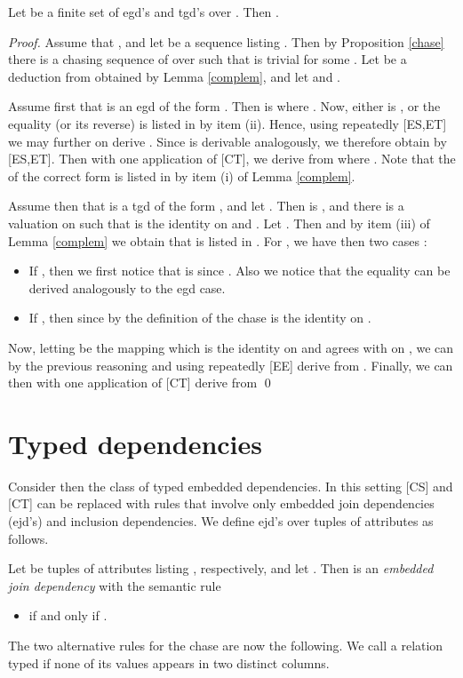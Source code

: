 \documentclass[envcountset]{llncs}
\begin{document}
\begin{theorem}
Let  be a finite set of egd's and tgd's over . Then  .
\end{theorem}
\begin{proof}
Assume that , and let  be a sequence listing . Then by Proposition \ref{chase} there is a chasing sequence  of  over  such that  is trivial for some . Let  be a deduction from  obtained by Lemma \ref{complem}, and let  and .

Assume first that  is an egd of the form . Then  is  where . Now, either  is , or the equality  (or its reverse) is listed in  by item (ii). Hence, using repeatedly [ES,ET] we may further on derive . Since  is derivable analogously, we therefore obtain  by [ES,ET]. Then with one application of [CT], we  derive  from  where . Note that the  of the correct form is listed in  by item (i) of Lemma \ref{complem}.


Assume then that  is a tgd of the form , and let . Then  is , and there is a valuation  on  such that  is the identity on  and .  Let  . Then  and by item (iii) of Lemma \ref{complem} we obtain that  is listed in .
For , we  have then two cases :
\begin{itemize}
\item If , then we first notice that  is  since  . Also we notice that the equality  can be derived analogously to the egd case. 
\item If , then  since by the definition of the chase  is the identity on . 

\end{itemize}
Now, letting  be the mapping  which is the identity on  and agrees with  on , we can by the previous reasoning and using repeatedly [EE]  derive  from . Finally, we can then with one application of [CT] derive  from 
 \qed

\end{proof}








\section{Typed dependencies}
Consider then the class of typed embedded dependencies. In this setting [CS] and [CT] can be replaced with rules that involve only embedded join dependencies (ejd's) and inclusion dependencies. We define ejd's over tuples of attributes as follows.
\begin{definition}\label{joinatom}
Let  be tuples of attributes listing , respectively, and let . Then  is an \emph{embedded join dependency} with the semantic rule
\begin{itemize}
\item  if and only if .
\end{itemize}

\end{definition}
The two alternative rules for the chase are now the following. We call a relation  typed if none of its values appears in two distinct columns. 
\end{document}
